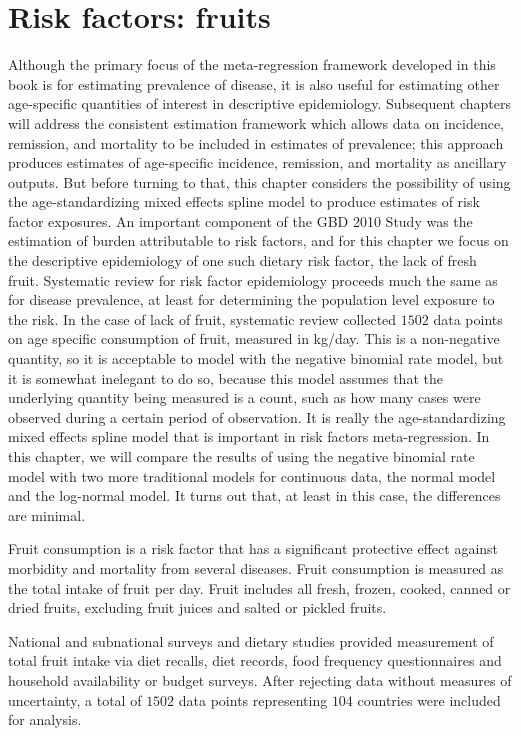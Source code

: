 \chapter{Risk factors: fruits}
\label{applications-log_normal}

Although the primary focus of the meta-regression framework developed
in this book is for estimating prevalence of disease, it is also
useful for estimating other age-specific quantities of interest in
descriptive epidemiology.  Subsequent chapters will address the
consistent estimation framework which allows data on incidence,
remission, and mortality to be included in estimates of prevalence;
this approach produces estimates of age-specific incidence, remission,
and mortality as ancillary outputs.  But before turning to that, 
this chapter considers the possibility of using the
age-standardizing mixed effects spline model to produce estimates of
risk factor exposures.  An important component of the GBD 2010 Study
was the estimation of burden attributable to risk factors, and for
this chapter we focus on the descriptive epidemiology of one such
dietary risk factor, the lack of fresh fruit.  Systematic review for
risk factor epidemiology proceeds much the same as for disease
prevalence, at least for determining the population level exposure to
the risk.  In the case of lack of fruit, systematic review collected
$1502$ data points on age specific consumption of fruit, measured in
kg/day.  This is a non-negative quantity, so it is acceptable to model
with the negative binomial rate model, but it is somewhat inelegant to
do so, because this model assumes that the underlying quantity being
measured is a count, such as how many cases were observed during a
certain period of observation.  It is really the age-standardizing
mixed effects spline model that is important in risk factors
meta-regression.  In this chapter, we will compare the results of
using the negative binomial rate model with two more traditional
models for continuous data, the normal model and the log-normal model.
It turns out that, at least in this case, the differences are minimal.

Fruit consumption is a risk factor that has a significant protective
effect against morbidity and mortality from several diseases.  Fruit
consumption is measured as the total intake of fruit per day.  Fruit
includes all fresh, frozen, cooked, canned or dried fruits, excluding
fruit juices and salted or pickled fruits. \cite{he_increased_2007,
  boeing_intake_2006}

National and subnational surveys and dietary studies provided
measurement of total fruit intake via diet recalls, diet records, food
frequency questionnaires and household availability or budget surveys.
After rejecting data without measures of uncertainty, a total of $1502$
data points representing $104$ countries were included for analysis.

